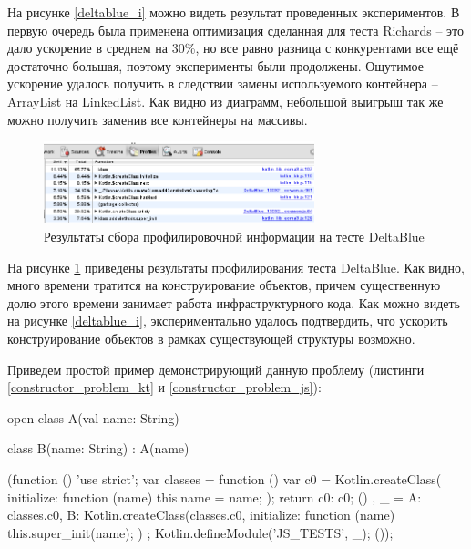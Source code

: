 На рисунке \ref{deltablue_i} можно видеть результат проведенных экспериментов. В первую очередь была применена оптимизация сделанная для теста Richards -- это дало ускорение в среднем на 30\%, но все равно разница с конкурентами все ещё достаточно большая, поэтому эксперименты были продолжены. Ощутимое ускорение удалось получить в следствии замены используемого контейнера -- ArrayList на LinkedList.
Как видно из диаграмм, небольшой выигрыш так же можно получить заменив все контейнеры на массивы. 

\begin{figure}[ht!]
\centering
\includegraphics[width=0.7\textwidth]{img/deltablue_0_profile.png}
\caption{Результаты сбора профилировочной информации на тесте DeltaBlue}
\label{deltablue_0_prifile}
\end{figure}

На рисунке \ref{deltablue_0_prifile} приведены результаты профилирования теста DeltaBlue. Как видно, много времени тратится на конструирование объектов, причем существенную долю этого времени занимает работа инфраструктурного кода. Как можно видеть на рисунке \ref{deltablue_i}, экспериментально удалось подтвердить, что ускорить конструирование объектов в рамках существующей структуры возможно.

Приведем простой пример демонстрирующий данную проблему (листинги \ref{constructor_problem_kt} и \ref{constructor_problem_js}):

\begin{code}
\begin{Kotlin}[caption=Пример с наследованием, label=constructor_problem_kt]
open class A(val name: String)

class B(name: String) : A(name)
\end{Kotlin}
\end{code}

\begin{code}
\begin{JavaScript}[caption=Результат компиляции примера с наследованием, label=constructor_problem_js]
(function () {
  'use strict';
  var classes = function () {
    var c0 = Kotlin.createClass({
      initialize: function (name) {
        this.name = name;
      }
    });
    return {c0: c0};
  }()
  , _ = {
    A: classes.c0,
    B: Kotlin.createClass(classes.c0, {
      initialize: function (name) {
        this.super_init(name);
      }
    })
  };
  Kotlin.defineModule('JS_TESTS', _);
}());
\end{JavaScript}
\end{code}

